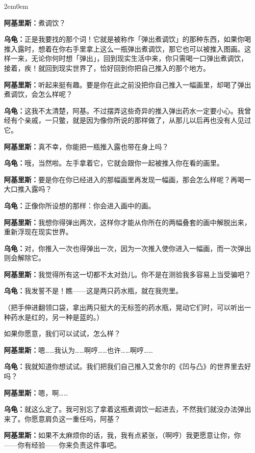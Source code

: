 \documentclass[
  12pt,
  twoside,
  openright,
  oldfontcommands,
]{memoir}
\newcommand{\dialogname}[1]{{\heifamily\bfseries #1}}
\begin{document}
\begin{adjustwidth}{2em}{0em}

\dialogname{阿基里斯：}煮调饮？

\dialogname{乌龟：}正是我要找的那个词！它就是被称作「弹出煮调饮」的那种东西，如果你喝推入露时，想着在你右手里拿上这么一瓶弹出煮调饮，那它也可以被推入图画。这样一来，无论你何时想「弹出」，回到现实生活中来，你只需喝一口弹出煮调饮，接着，疾！就回到现实世界了，恰好回到你把自己推入的那个地方。

\dialogname{阿基里斯：}听起来挺有趣。要是你在此之前没把你自己推入一幅画里，却喝了弹出煮调饮，会怎么样呢？

\dialogname{乌龟：}这我不太清楚，阿基。不过摆弄这些奇异的推入弹出药水一定要小心。我曾经有个亲戚，一只鳖，就是因为像你所说的那样做了，从那儿以后再也没有人见过它。

\dialogname{阿基里斯：}真不幸，你能把一瓶推入露也带在身上吗？

\dialogname{乌龟：}哦，当然啦。左手拿着它，它就会跟你一起被推入你在看的画里。

\dialogname{阿基里斯：}要是你在你已经进入的那幅画里再发现一幅画，那会怎么样呢？再喝一大口推入露吗？

\dialogname{乌龟：}正像你所设想的那样：你会进入画中的画。

\dialogname{阿基里斯：}我想你得弹出两次，这样你才能从你所在的两幅叠套的画中解脱出来，重新浮现在现实世界。

\dialogname{乌龟：}对，你推入一次也得弹出一次，因为一次推入使你进入一幅画，而一次弹出则会解除它。

\dialogname{阿基里斯：}我觉得所有这一切都不太对劲儿。你不是在测验我多容易上当受骗吧？

\dialogname{乌龟：}我发誓不是！瞧------这是两只药水瓶，就在我兜里。

（把手伸进翻领口袋，拿出两只挺大的无标签的药水瓶，晃动它们时，可以听出一种药水是红的，另一种是蓝的。）

如果你愿意，我们可以试试，怎么样？

\dialogname{阿基里斯：}嗯\ldots\ldots 我认为\ldots\ldots 啊哼\ldots\ldots 也许\ldots\ldots 啊哼\ldots\ldots{}

\dialogname{乌龟：}我就知道你想试试。我们把我们自己推入艾舍尔的《凹与凸》的世界里去好吗？

\dialogname{阿基里斯：}嗯，啊\ldots\ldots{}

\dialogname{乌龟：}就这么定了。我可别忘了拿着这瓶煮调饮一起进去，不然我们就没办法弹出来了。你愿意肩负这一重任吗，阿基？

\dialogname{阿基里斯：}如果不太麻烦你的话，我，我有点紧张，（啊哼）我更愿意让你，你------你有经验------你来负责这件事吧。


\end{adjustwidth}
\end{document}
